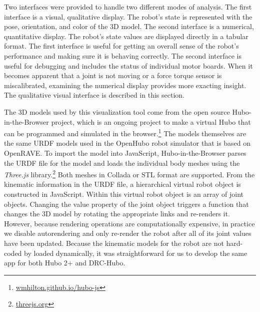 \documentclass[letterpaper, 10 pt, conference]{ieee/ieeeconf}  %
\begin{document}
Two interfaces were provided to handle two different modes of analysis.
The first interface is a visual, qualitative display.
The robot's state is represented with the pose, orientation, and color of the 3D model.
The second interface is a numerical, quantitative display.
The robot's state values are displayed directly in a tabular format.
The first interface is useful for getting an overall sense of the robot's performance and making sure it is behaving correctly.
The second interface is useful for debugging and includes the status of individual motor boards.
When it becomes apparent that a joint is not moving or a force torque sensor is miscalibrated, examining the numerical display provides more exacting insight.
The qualitative visual interface is described in this section.

The 3D models used by this visualization tool come from the open source Hubo-in-the-Browser project, which is an ongoing project to make a virtual Hubo that can be programmed and simulated in the browser.\footnote{\url{wmhilton.github.io/hubo-js}}
The models themselves are the same URDF models used in the OpenHubo robot simulator that is based on OpenRAVE. \cite{zhang2013motion}
To import the model into JavaScript, Hubo-in-the-Browser parses the URDF file for the model and loads the individual body meshes using the \textit{Three.js} library.\footnote{\url{threejs.org}}
Both meshes in Collada or STL format are supported.
From the kinematic information in the URDF file, a hierarchical virtual robot object is constructed in JavaScript.
Within this virtual robot object is an array of joint objects.
Changing the value property of the joint object triggers a function that changes the 3D model by rotating the appropriate links and re-renders it.
However, because rendering operations are computationally expensive, in practice we disable autorendering and only re-render the robot after all of its joint values have been updated.
Because the kinematic models for the robot are not hard-coded by loaded dynamically, it was straightforward for us to develop the same app for both Hubo 2+ and DRC-Hubo.
\end{document}
